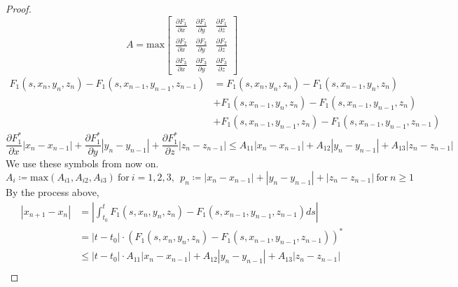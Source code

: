 \documentclass[a4paper,10pt]{article}
\begin{document}
\begin{proof}
        \begin{displaymath}
            A = \text{max}
            \begin{bmatrix}
                \frac{\partial F_1}{\partial x} & \frac{\partial F_1}{\partial y} & \frac{\partial F_1}{\partial z} \\
                \frac{\partial F_2}{\partial x} & \frac{\partial F_2}{\partial y} & \frac{\partial F_2}{\partial z} \\
                \frac{\partial F_3}{\partial x} & \frac{\partial F_3}{\partial y} & \frac{\partial F_3}{\partial z}
            \end{bmatrix}
        \end{displaymath}
        \begin{align*}
            F_1(s, x_{n}, y_{n}, z_{n}) - F_1(s, x_{n-1}, y_{n-1}, z_{n-1}) &= F_1(s, x_{n}, y_{n}, z_{n}) - F_1(s, x_{n-1}, y_n, z_n) \\
                                                                         &+ F_1(s, x_{n-1}, y_{n}, z_{n}) - F_1(s, x_{n-1}, y_{n-1}, z_n) \\
                                                                         &+ F_1(s, x_{n-1}, y_{n-1}, z_{n}) - F_1(s, x_{n-1}, y_{n-1}, z_{n-1})
        \end{align*}
        \begin{displaymath}
            \frac{\partial F_1^{*}}{\partial x} |x_{n} - x_{n-1}| + \frac{\partial F_1^{*}}{\partial y} |y_{n} - y_{n-1}| + \frac{\partial F_1^{*}}{\partial z} |z_{n} - z_{n-1}| \leq A_{11} |x_{n} - x_{n-1}| + A_{12} |y_{n} - y_{n-1}|+ A_{13} |z_{n} - z_{n-1}|
        \end{displaymath}
        We use these symbols from now on.
        \begin{displaymath}
            A_i \coloneqq \text{max}(A_{i1}, A_{i2}, A_{i3}) \ \text{for} \ i = 1, 2, 3, \ \ p_n \coloneqq |x_{n} - x_{n-1}| + |y_{n} - y_{n-1}|+ |z_{n} - z_{n-1}| \ \text{for} \ n \geq 1
        \end{displaymath}
        By the process above,
        \begin{align*}
            |x_{n+1} - x_n| &= \left| \int_{t_0}^t F_1(s, x_{n}, y_{n}, z_{n}) - F_1(s, x_{n-1}, y_{n-1}, z_{n-1}) ds \right| \\
            &= |t - t_0| \cdot (F_1(s, x_{n}, y_{n}, z_{n}) - F_1(s, x_{n-1}, y_{n-1}, z_{n-1}))^{*} \\
            &\leq |t - t_0| \cdot A_{11} |x_{n} - x_{n-1}| + A_{12} |y_{n} - y_{n-1}|+ A_{13} |z_{n} - z_{n-1}| \\

\end{align*}
\end{proof}
\end{document}
